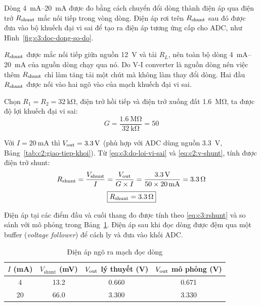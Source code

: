 Dòng \qtyrange{4}{20}{\milli\ampere} được đo bằng cách chuyển đổi dòng thành điện áp qua điện trở $R_{\mathrm{shunt}}$
mắc nối tiếp trong vòng dòng. Điện áp rơi trên $R_{\mathrm{shunt}}$ sau đó được đưa vào bộ khuếch đại vi sai để tạo ra
điện áp tương ứng cấp cho ADC, như Hình~\ref{fig:c3:doc-dong-so-do}.


$R_{\mathrm{shunt}}$ được mắc nối tiếp giữa nguồn \qty{12}{\volt} và tải $R_L$, nên toàn bộ dòng
\qtyrange{4}{20}{\milli\ampere} của nguồn dòng chạy qua nó. Do V-I converter là nguồn dòng nên việc thêm
$R_{\mathrm{shunt}}$ chỉ làm tăng tải một chút mà không làm thay đổi dòng. Hai đầu $R_{\mathrm{shunt}}$ được nối vào hai ngõ vào
của mạch khuếch đại vi sai.

Chọn $R_1 = R_2 = \qty{32}{\kilo\ohm}$, điện trở hồi tiếp và điện trở xuống đất \qty{1.6}{\mega\ohm}, ta được
độ lợi khuếch đại vi sai:
\begin{equation}
    G = \frac{\qty{1.6}{\mega\ohm}}{\qty{32}{\kilo\ohm}} = 50
    \label{eq:c3:do-loi-vi-sai}
\end{equation}

Với $I = \qty{20}{\milli\ampere}$ thì $V_{\mathrm{out}} = \qty{3.3}{\volt}$ (phù hợp với ADC dùng nguồn \qty{3.3}{\volt},
Bảng~\ref{tab:c2:giao-tiep-khoi}). Từ \eqref{eq:c3:do-loi-vi-sai} và \eqref{eq:c2:v-shunt}, tính được điện trở shunt:
\begin{equation}
    R_{\mathrm{shunt}} = \frac{V_{\mathrm{shunt}}}{I} = \frac{V_{\mathrm{out}}}{G \times I}
    = \frac{\qty{3.3}{\volt}}{50 \times \qty{20}{\milli\ampere}} = \qty{3.3}{\ohm}
    \label{eq:c3:rshunt}
\end{equation}
\[
    \boxed{R_{\mathrm{shunt}} = \qty{3.3}{\ohm}}
\]

Điện áp tại các điểm đầu và cuối thang đo được tính theo \eqref{eq:c3:rshunt} và so sánh với mô phỏng trong
Bảng~\ref{tab:c3:doc-dong-dien-ap}. Điện áp sau khi đọc dòng được đệm qua một buffer (\textit{voltage follower})
để cách ly và đưa vào khối ADC.

\begin{table}[H]
    \centering
    \caption{Điện áp ngõ ra mạch đọc dòng}
    \label{tab:c3:doc-dong-dien-ap}
    \renewcommand{\arraystretch}{1.3}
    \begin{tabular}{|c|c|c|c|}
        \hline
        \textbf{$I$ (\unit{\milli\ampere})} & \textbf{$V_{\mathrm{shunt}}$ (\unit{\milli\volt})} &
        \textbf{$V_{\mathrm{out}}$ lý thuyết (\unit{\volt})} & \textbf{$V_{\mathrm{out}}$ mô phỏng (\unit{\volt})} \\ \hline
        4  & 13.2 & 0.660 & 0.671 \\ \hline
        20 & 66.0 & 3.300 & 3.330 \\ \hline
    \end{tabular}
\end{table}

